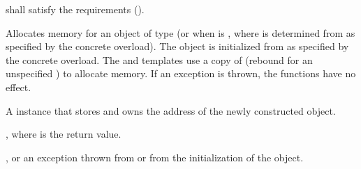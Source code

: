 \begin{itemdescr}
\pnum
\requires {} shall satisfy the 
requirements ().

\pnum
\effects Allocates memory for an object of type 
(or  when  is ,
where  is determined from  as specified by the concrete overload).
The object is initialized from  as specified by the concrete overload.
The  and  templates
use a copy of 
(rebound for an unspecified ) to allocate memory.
If an exception is thrown, the functions have no effect.

\pnum
\returns A  instance that stores and owns the address of
the newly constructed object.

\pnum
\ensures {},
where  is the return value.

\pnum
\throws {}, or
an exception thrown from  or from the initialization of the object.


\end{itemdescr}
